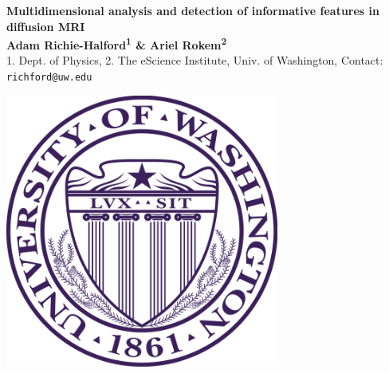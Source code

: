 \documentclass[a0, landscape]{a0poster}
\begin{document}


\begin{minipage}[b]{0.878\linewidth}
\veryHuge \color{NavyBlue} \textbf{Multidimensional analysis and detection of informative features in diffusion MRI} \color{Black}\\ %
\huge \textbf{Adam Richie-Halford\textsuperscript{1} \& Ariel Rokem\textsuperscript{2}}\\ %
\Large 1. Dept. of Physics, 2. The eScience Institute, Univ. of Washington, %
\Large Contact: \texttt{richford@uw.edu}
\end{minipage}
%
%
\begin{minipage}[b]{0.12\linewidth}
\includegraphics[width=9cm]{UWlogo.png}
\end{minipage}
\end{document}
